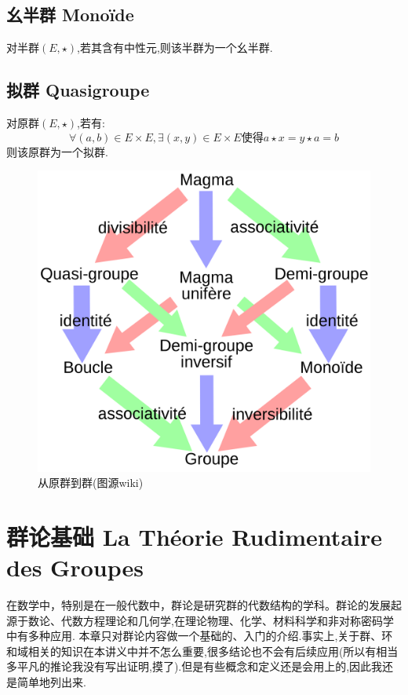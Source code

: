 \documentclass[12pt, a4paper, oneside]{ctexbook}
\begin{document}
  \subsection{幺半群 Monoïde}
  对半群$(E,\star)$,若其含有中性元,则该半群为一个幺半群.

  \subsection{拟群 Quasigroupe}
  对原群$(E,\star)$,若有:
  $$
  \forall (a,b)\in E\times E, \exists (x,y)\in E\times E\text{使得}a\star x=y\star a=b
  $$则该原群为一个拟群.


  \begin{figure}[H]
    \centering
    \includegraphics[scale=0.13]{magma_groupe.png}
    \caption{从原群到群(图源wiki)}
    \label{myref:groupe_magma}
  \end{figure}

  \section{群论基础 La Théorie Rudimentaire des Groupes}
  在数学中，特别是在一般代数中，群论是研究群的代数结构的学科。群论的发展起源于数论、代数方程理论和几何学,在理论物理、化学、材料科学和非对称密码学中有多种应用.
  本章只对群论内容做一个基础的、入门的介绍.事实上,关于群、环和域相关的知识在本讲义中并不怎么重要,很多结论也不会有后续应用(所以有相当多平凡的推论我没有写出证明,摸了).但是有些概念和定义还是会用上的,因此我还是简单地列出来.
\end{document}
